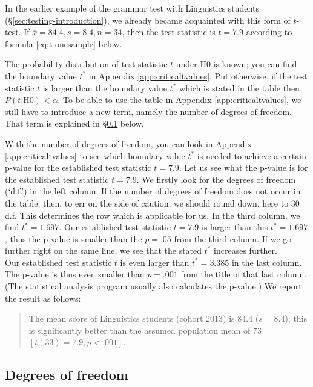 \documentclass[
]{book}
\begin{document}
In the earlier example of the grammar test with Linguistics students
(§\ref{sec:testing-introduction}), we already became acquainted with
this form of \(t\)-test.
If \(\overline{x}=84.4, s=8.4, n=34\), then the test statistic
is \(t=7.9\) according to formula \eqref{eq:t-onesample} below.

The probability distribution of test statistic \(t\) under H0 is known;
you can find the boundary value \(t^*\) in
Appendix \ref{app:criticaltvalues}. Put otherwise, if the test statistic \(t\)
is larger than the boundary value \(t^*\) which is stated in the table then
\(P(t|\textrm{H0})<\alpha\). To be able to use the table in Appendix
\ref{app:criticaltvalues}, we still have to introduce a new term,
namely the number of degrees of freedom. That term is
explained in
§\ref{sec:ttest-freedomdegrees} below.

With the number of degrees of freedom, you can look in Appendix
\ref{app:criticaltvalues} to see which boundary value \(t^*\) is needed
to achieve a certain p-value for the established test statistic
\(t=7.9\). Let us see what the p-value is for the established
test statistic \(t=7.9\). We firstly look for the degrees of freedom (`d.f.') in the left column.
If the number of degrees of freedom does not occur in the table, then, to err
on the side of caution, we should round down, here to 30 d.f. This determines the row
which is applicable for us. In the third column, we find \(t^*=1.697\). Our
established test statistic \(t=7.9\) is larger than this \(t^*=1.697\), thus the p-value
is smaller than the \(p=.05\) from the third column. If we go further right on
the same line, we see that the stated \(t^*\) increases further.\\
Our established test statistic \(t\) is even larger than \(t^*=3.385\) in the last column.
The p-value is thus even smaller than \(p=.001\) from the title of that last
column. (The statistical analysis program usually also calculates the p-value.)
We report the result as follows:

\begin{quote}
The mean score of Linguistics students (cohort 2013) is
84.4 (\(s=8.4\)); this is significantly better than the assumed
population mean of 73 \([t(33)=7.9, p<.001]\).
\end{quote}

\hypertarget{sec:ttest-freedomdegrees}{%
\subsection{Degrees of freedom}\label{sec:ttest-freedomdegrees}}
\end{document}
